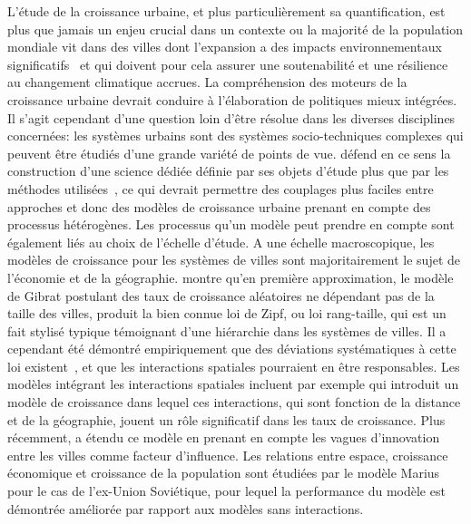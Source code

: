 {L'étude de la croissance urbaine, et plus particulièrement sa quantification, est plus que jamais un enjeu crucial dans un contexte ou la majorité de la population mondiale vit dans des villes dont l'expansion a des impacts environnementaux significatifs~\cite{seto2012global} et qui doivent pour cela assurer une soutenabilité et une résilience au changement climatique accrues. La compréhension des moteurs de la croissance urbaine devrait conduire à l'élaboration de politiques mieux intégrées. Il s'agit cependant d'une question loin d'être résolue dans les diverses disciplines concernées: les systèmes urbains sont des systèmes socio-techniques complexes qui peuvent être étudiés d'une grande variété de points de vue.  défend en ce sens la construction d'une science dédiée définie par ses objets d'étude plus que par les méthodes utilisées~\cite{batty2013new}, ce qui devrait permettre des couplages plus faciles entre approches et donc des modèles de croissance urbaine prenant en compte des processus hétérogènes. Les processus qu'un modèle peut prendre en compte sont également liés au choix de l'échelle d'étude. A une échelle macroscopique, les modèles de croissance pour les systèmes de villes sont majoritairement le sujet de l'économie et de la géographie. \cite{gabaix1999zipf} montre qu'en première approximation, le modèle de Gibrat postulant des taux de croissance aléatoires ne dépendant pas de la taille des villes, produit la bien connue loi de Zipf, ou loi rang-taille, qui est un fait stylisé typique témoignant d'une hiérarchie dans les systèmes de villes. Il a cependant été démontré empiriquement que des déviations systématiques à cette loi existent~\cite{rozenfeld2008laws}, et que les interactions spatiales pourraient en être responsables. Les modèles intégrant les interactions spatiales incluent par exemple \cite{bretagnolle2000long} qui introduit un modèle de croissance dans lequel ces interactions, qui sont fonction de la distance et de la géographie, jouent un rôle significatif dans les taux de croissance. Plus récemment, \cite{favaro2011gibrat} a étendu ce modèle en prenant en compte les vagues d'innovation entre les villes comme facteur d'influence. Les relations entre espace, croissance économique et croissance de la population sont étudiées par le modèle Marius~\cite{cottineau2014evolution} pour le cas de l'ex-Union Soviétique, pour lequel la performance du modèle est démontrée améliorée par rapport aux modèles sans interactions.
}

